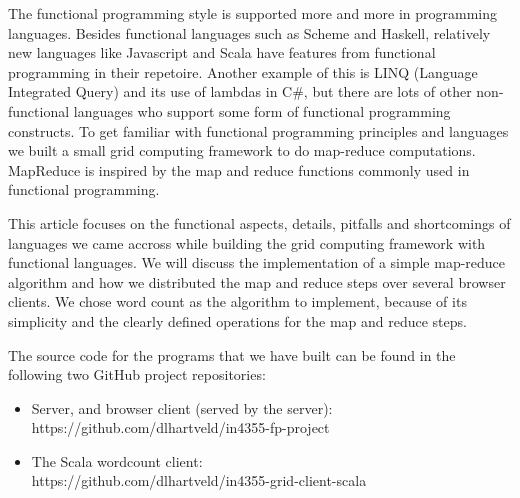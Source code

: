 The functional programming style is supported more and more in programming
languages. Besides functional languages such as Scheme and Haskell, relatively
new languages like Javascript and Scala have features from functional
programming in their repetoire. Another example of this is LINQ (Language
Integrated Query) and its use of lambdas in C\#, but there are lots of other
non-functional languages who support some form of functional programming
constructs. To get familiar with functional programming principles and languages
we built a small grid computing framework to do map-reduce computations.
MapReduce is inspired by the map and reduce functions commonly used in
functional programming.

This article focuses on the functional aspects, details, pitfalls and
shortcomings of languages we came accross while building the grid computing
framework with functional languages. We will discuss the implementation of a
simple map-reduce algorithm and how we distributed the map and reduce steps over
several browser clients. We chose word count as the algorithm to implement,
because of its simplicity and the clearly defined operations for the map and
reduce steps.

The source code for the programs that we have built can be found in the following
two GitHub project repositories:
\begin{itemize}
  \item Server, and browser client (served by the server):\\
  		https://github.com/dlhartveld/in4355-fp-project
  \item The Scala wordcount client:\\
  		https://github.com/dlhartveld/in4355-grid-client-scala
\end{itemize}
